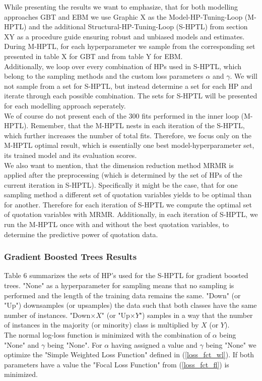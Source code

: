 \documentclass[12pt,titlepage]{article}
\begin{document}
While presenting the results we want to emphasize, that for both modelling approaches GBT and EBM we use Graphic X as the Model-HP-Tuning-Loop (M-HPTL) and the additional Structural-HP-Tuning-Loop (S-HPTL) from section XY as a procedure guide ensuring robust and unbiased models and estimates. During M-HPTL, for each hyperparameter we sample from the corresponding set presented in table X for GBT and from table Y for EBM. \\
Additionally, we loop over every combination of HPs used in S-HPTL, which belong to the sampling methods and the custom loss parameters $\alpha$ and $\gamma$. We will not sample from a set for S-HPTL, but instead determine a set for each HP and iterate through each possible combination. The sets for S-HPTL will be presented for each modelling approach seperately. \\
We of course do not present each of the 300 fits performed in the inner loop (M-HPTL). Remember, that the M-HPTL nests in each iteration of the S-HPTL, which further increases the number of total fits. Therefore, we focus only on the M-HPTL optimal result, which is essentially one best model-hyperparameter set, its trained model and its evaluation scores. \\
We also want to mention, that the dimension reduction method MRMR is applied after the preprocessing (which is determined by the set of HPs of the current iteration in S-HPTL). Specifically it might be the case, that for one sampling method a different set of quotation variables yields to be optimal than for another. Therefore for each iteration of S-HPTL we compute the optimal set of quotation variables with MRMR. Additionally, in each iteration of S-HPTL, we run the M-HPTL once with and without the best quotation variables, to determine the predictive power of quotation data. \\

\subsubsection*{Gradient Boosted Trees Results}
Table 6 summarizes the sets of HP's used for the S-HPTL for gradient boosted trees. "None" as a hyperparameter for sampling means that no sampling is performed and the length of the training data remains the same. "Down" (or "Up") downsamples (or upsamples) the data such that both classes have the same number of instances. "Down$\times X$" (or "Up$\times Y$") samples in a way that the number of instances in the majority (or minority) class is multiplied by $X$ (or $Y$). \\
The normal log-loss function is minimized with the combination of $\alpha$ being "None" and $\gamma$ being "None". For $\alpha$ having assigned a value and $\gamma$ being "None" we optimize the "Simple Weighted Loss Function" defined in (\ref{loss_fct_wl}). If both parameters have a value the "Focal Loss Function" from (\ref{loss_fct_fl}) is minimized. \\
\end{document}
